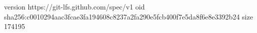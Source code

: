 version https://git-lfs.github.com/spec/v1
oid sha256:c0010294aac3fcae3fa194608c8237a2fa290e5fcb400f7e5da8f6e8e3392b24
size 174195
